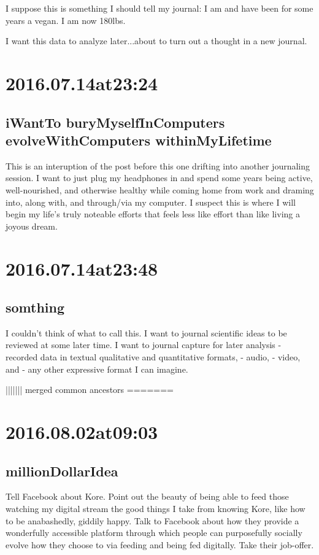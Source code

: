 I suppose this is something I should tell my journal: I am and have been for some years a vegan. I am now 180lbs.

I want this data to analyze later...about to turn out a thought in a new journal.

\section*{ 2016.07.14at23:24 }
\subsection*{ iWantTo buryMyselfInComputers evolveWithComputers withinMyLifetime }
This is an interuption of the post before this one drifting into another journaling session. I want to just plug my headphones in and spend some years being active, well-nourished, and otherwise healthy while coming home from work and draming into, along with, and through/via my computer. I suspect this is where I will begin my life's truly noteable efforts that feels less like effort than like living a joyous dream.

\section*{ 2016.07.14at23:48 }
\subsection*{ somthing }
I couldn't think of what to call this. I want to journal scientific ideas to be reviewed at some later time. I want to journal capture for later analysis
- recorded data in textual qualitative and quantitative formats,
- audio,
- video, and 
- any other expressive format I can imagine.

||||||| merged common ancestors
=======

\section*{ 2016.08.02at09:03 }
\subsection*{ millionDollarIdea }
Tell Facebook about Kore. Point out the beauty of being able to feed those watching my digital stream the good things I take from knowing Kore, like how to be anabashedly, giddily happy. Talk to Facebook about how they provide a wonderfully accessible platform through which people can purposefully socially evolve how they choose to via feeding and being fed digitally. Take their job-offer.


